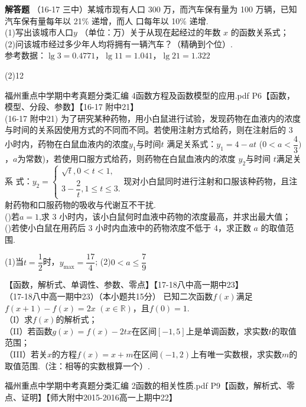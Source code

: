 \begin{exercise}{\bf 解答题}
     （16-17 三中）某城市现有人口 300 万，而汽车保有量为 100 万辆，已知汽车保有量每年以 21\% 递增，而人 口每年以 10\% 递增.\\
     (1)写出该城市人口$y$ （单位：万）关于从现在起经过的年数 $x$ 的函数关系式；\\ (2)问该城市经过多少年人均将拥有一辆汽车？（精确到个位）.\\
     参考数据：$\lg3=0.4771$，$\lg11=1.041$，$\lg21=1.322$
     \begin{answer}
       (2)12
     \end{answer}
    \item 福州重点中学期中考真题分类汇编 4函数方程及函数模型的应用.pdf P6【函数，模型、分段、参数】【16-17 附中21】\\
     (16-17 附中21) 为了研究某种药物，用小白鼠进行试验，发现药物在血液内的浓度与时间的关系因使用方式的不同而不同。若使用注射方式给药，则在注射后的 3 小时内，药物在白鼠血液内的浓度$y_1$与时间$t$ 满足关系式：$y_1 =4-at$ ($0<a<\dfrac{4}{3})$，$a$为常数)，若使用口服方式给药，则药物在白鼠血液内的浓度 $y_2$与时间 $t$满足关系 式：$y_2=\begin{cases}\sqrt{t},0<t<1,\\3-\dfrac{2}{t},1\leq t\leq3.\end{cases}$现对小白鼠同时进行注射和口服该种药物，且注射药物和口服药物的吸收与代谢互不干扰.\\
     ()若$a=1$,求 3 小时内，该小白鼠何时血液中药物的浓度最高，并求出最大值；\\
     ()若使小白鼠在用药后 3 小时内血液中的药物浓度不低于 4，求正数 $a$ 的取值范围.
     \begin{answer}
      (1)当$t=\dfrac12$时，$y_{\max}=\dfrac{17}{4}$;
      (2)$0<a\leq\dfrac{7}{9}$
     \end{answer}
    \item 【函数，解析式、单调性、参数、零点】【17-18八中高一期中23】\\
     （17-18八中高一期中23）（本小题共15分）
     已知二次函数$f(x)$满足$f(x+1)-f(x)=2x $ $(x\in\mathbb{R})$，且$f(0)=1$.\\
     （I）求$f(x)$的解析式；\\
     （II）若函数$g(x)=f(x)-2tx$在区间$[-1,5]$上是单调函数，求实数$t$的取值范围；\\
     （III）若关$x$的方程$f(x)=x+m $在区间$(-1,2)$上有唯一实数根，求实数$m$的取值范围.（注：相等的实数根算一个）.
    \item 福州重点中学期中考真题分类汇编 2函数的相关性质.pdf P9【函数，解析式、零点、证明】【师大附中2015-2016高一上期中22】\\

\end{exercise}
